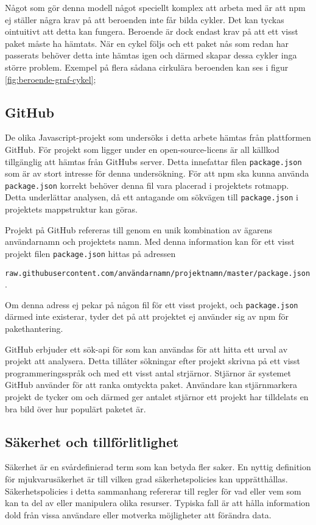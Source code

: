 Något som gör denna modell något speciellt komplex att arbeta med är att npm ej ställer några krav på att beroenden inte får bilda cykler. Det kan tyckas ointuitivt att detta kan fungera. Beroende är dock endast krav på att ett visst paket måste ha hämtats. När en cykel följs och ett paket nås som redan har passerats behöver detta inte hämtas igen och därmed skapar dessa cykler inga större problem. Exempel på flera sådana cirkulära beroenden kan ses i figur \ref{fig:beroende-graf-cykel};

\subsection{GitHub}
De olika Javascript-projekt som undersöks i detta arbete hämtas från plattformen GitHub. För projekt som ligger under en open-source-licens är all källkod tillgänglig att hämtas från GitHubs server. Detta innefattar filen \texttt{package.json} som är av stort intresse för denna undersökning. För att npm ska kunna använda \texttt{package.json} korrekt behöver denna fil vara placerad i projektets rotmapp. Detta underlättar analysen, då ett antagande om sökvägen till \texttt{package.json} i projektets mappstruktur kan göras.

Projekt på GitHub refereras till genom en unik kombination av ägarens användarnamn och projektets namn. Med denna information kan för ett visst projekt filen \texttt{package.json} hittas på adressen

\texttt{raw.githubusercontent.com/användarnamn/projektnamn/master/package.json}.

Om denna adress ej pekar på någon fil för ett visst projekt, och \texttt{package.json} därmed inte existerar, tyder det på att projektet ej använder sig av npm för pakethantering.

GitHub erbjuder ett sök-api för som kan användas för att hitta ett urval av projekt att analysera.\cite{github-api} Detta tillåter sökningar efter projekt skrivna på ett visst programmeringsspråk och med ett visst antal strjärnor. Stjärnor är systemet GitHub använder för att ranka omtyckta paket. Användare kan stjärnmarkera projekt de tycker om och därmed ger antalet stjärnor ett projekt har tilldelats en bra bild över hur populärt paketet är.

\subsection{Säkerhet och tillförlitlighet}
Säkerhet är en svårdefinierad term som kan betyda fler saker. En nyttig definition för mjukvarusäkerhet är till vilken grad säkerhetspolicies kan upprätthållas. Säkerhetspolicies i detta sammanhang refererar till regler för vad eller vem som kan ta del av eller manipulera olika resurser.\cite{secure-software} Typiska fall är att hålla information dold från vissa användare eller motverka möjligheter att förändra data.

